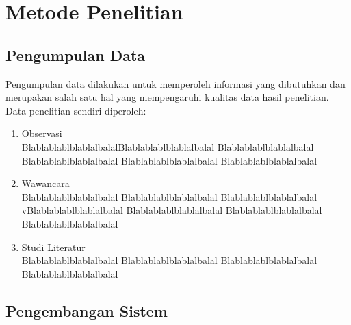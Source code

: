 \section{Metode Penelitian}

\subsection{Pengumpulan Data}
Pengumpulan data dilakukan untuk memperoleh informasi yang
dibutuhkan dan merupakan salah satu hal yang mempengaruhi kualitas data hasil penelitian. Data penelitian sendiri diperoleh:
\begin{enumerate}[nolistsep,leftmargin=0.5cm]
\item Observasi \\
BlablablablblablalbalalBlablablablblablalbalal Blablablablblablalbalal Blablablablblablalbalal Blablablablblablalbalal Blablablablblablalbalal
\item Wawancara \\
Blablablablblablalbalal Blablablablblablalbalal Blablablablblablalbalal vBlablablablblablalbalal Blablablablblablalbalal Blablablablblablalbalal Blablablablblablalbalal
\item Studi Literatur \\
Blablablablblablalbalal Blablablablblablalbalal Blablablablblablalbalal Blablablablblablalbalal
\end{enumerate}

\subsection{Pengembangan Sistem}

